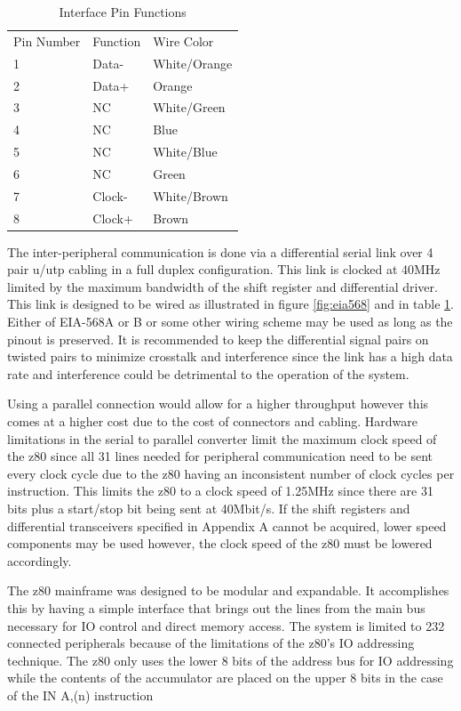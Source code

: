 \documentclass{book}
\begin{document}
\begin{table}
\centering
\begin{tabular}{| l | l | l |}
Pin Number & Function & Wire Color\\
1 & Data- & White/Orange\\
2 & Data+ & Orange\\
3 & NC & White/Green\\
4 & NC & Blue\\
5 & NC & White/Blue\\
6 & NC & Green\\
7 & Clock- & White/Brown\\
8 & Clock+ & Brown\\
\end{tabular}
\caption{Interface Pin Functions\label{tab:intpin}}
\end{table}
The inter-peripheral communication is done via a differential serial link over 4 pair u/utp cabling in a full duplex configuration. This link is clocked at 40MHz limited by the maximum bandwidth of the shift register and differential driver. This link is designed to be wired as illustrated in figure \ref{fig:eia568} and in table \ref{tab:intpin}. Either of EIA-568A or B or some other wiring scheme may be used as long as the pinout is preserved. It is recommended to keep the differential signal pairs on twisted pairs to minimize crosstalk and interference since the link has a high data rate and interference could be detrimental to the operation of the system.

Using a parallel connection would allow for a higher throughput however this comes at a higher cost due to the cost of connectors and cabling. Hardware limitations in the serial to parallel converter limit the maximum clock speed of the z80 since all 31 lines needed for peripheral communication need to be sent every clock cycle due to the z80 having an inconsistent number of clock cycles per instruction. This limits the z80 to a clock speed of 1.25MHz since there are 31 bits plus a start/stop bit being sent at 40Mbit/s. If the shift registers and differential transceivers specified in Appendix A cannot be acquired, lower speed components may be used however, the clock speed of the z80 must be lowered accordingly.

The z80 mainframe was designed to be modular and expandable. It accomplishes this by having a simple interface that brings out the lines from the main bus necessary for IO control and direct memory access. The system is limited to 232 connected peripherals because of the limitations of the z80's IO addressing technique. The z80 only uses the lower 8 bits of the address bus for IO addressing while the contents of the accumulator are placed on the upper 8 bits in the case of  the IN A,(n) instruction\cite[p.~295]{zlg:z80}
\end{document}

